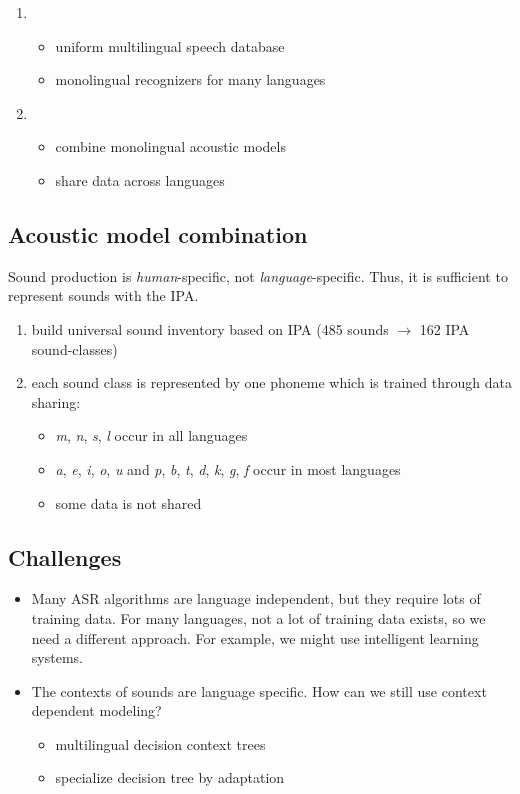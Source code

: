 \begin{enumerate}
    \item \begin{itemize}
            \item uniform multilingual speech database
            \item monolingual recognizers for many languages
        \end{itemize}
    \item \begin{itemize}
            \item combine monolingual acoustic models
            \item share data across languages
        \end{itemize}
\end{enumerate}

\subsection{Acoustic model combination}

Sound production is \textit{human}-specific, not \textit{language}-specific. Thus, it is sufficient to represent sounds with the IPA.
\begin{enumerate}
    \item build universal sound inventory based on IPA (485 sounds $\rightarrow$ 162 IPA sound-classes)
    \item each sound class is represented by one phoneme which is trained through data sharing:
        \begin{itemize}
            \item \textit{m}, \textit{n}, \textit{s}, \textit{l} occur in all languages
            \item \textit{a}, \textit{e}, \textit{i}, \textit{o}, \textit{u} and \textit{p}, \textit{b}, \textit{t}, \textit{d}, \textit{k}, \textit{g}, \textit{f} occur in most languages
            \item some data is not shared
        \end{itemize}
\end{enumerate}


\subsection{Challenges}

\begin{itemize}
    \item Many ASR algorithms are language independent, but they require lots of training data. For many languages, not a lot of training data exists, so we need a different approach. For example, we might use intelligent learning systems.
    \item The contexts of sounds are language specific. How can we still use context dependent modeling?
        \begin{itemize}
            \item multilingual decision context trees
            \item specialize decision tree by adaptation
        \end{itemize}
\end{itemize}


